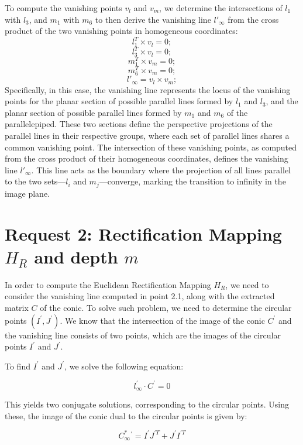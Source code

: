 \documentclass{Configuration_Files/PoliMi3i_thesis}
\begin{document}
\noindent
To compute the vanishing points \( v_l \) and \( v_m \), we determine the intersections of \( l_1 \) with \( l_3 \), and \( m_1 \) with \( m_6 \) to then derive the vanishing line \( l'_\infty \) from the cross product of the two vanishing points in homogeneous coordinates:
\[
l_1^T \times v_l = 0;  
\]
\[
l_3^T \times v_l = 0;  
\]
\[
m_1^T \times v_m = 0;  
\]
\[
m_6^T \times v_m = 0;  
\]
\[
l'_\infty = v_l \times v_m;  
\]
Specifically, in this case, the vanishing line represents the locus of the vanishing points for the planar section of possible parallel lines formed by \( l_1 \) and \( l_3 \), and the planar section of possible parallel lines formed by \( m_1 \) and \( m_6 \) of the parallelepiped. These two sections define the perspective projections of the parallel lines in their respective groups, where each set of parallel lines shares a common vanishing point. The intersection of these vanishing points, as computed from the cross product of their homogeneous coordinates, defines the vanishing line \( l'_\infty \). This line acts as the boundary where the projection of all lines parallel to the two sets—\( l_i \) and \( m_j \)—converge, marking the transition to infinity in the image plane. 

\newpage
\section{Request 2: Rectification Mapping \( H_R \) and depth \(m\)}

\noindent
In order to compute the Euclidean Rectification Mapping $H_R$, we need to consider the vanishing line computed in point 2.1, along with the extracted matrix $C$ of the conic. To solve such problem, we need to determine the circular points \((I^{\prime}, J^{\prime})\). We know that the intersection of the image of the conic \(C^{\prime}\) and the vanishing line consists of two points, which are the images of the circular points \(I^{\prime}\) and \(J^{\prime}\).

\noindent
To find \(I^{\prime}\) and \(J^{\prime}\), we solve the following equation:

\[
l^{\prime}_{\infty} \cdot C^{\prime} = 0  
\]

\noindent
This yields two conjugate solutions, corresponding to the circular points. Using these, the image of the conic dual to the circular points is given by:

\[
C^{*}_{\infty}{}^{\prime} = I^{\prime}J^{\prime T} + J^{\prime}I^{\prime T}  
\]
\end{document}
